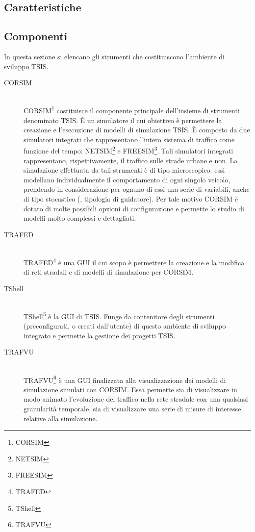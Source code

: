 \subsection{Caratteristiche}

\subsection{Componenti}

In questa sezione si elencano gli strumenti che costituiscono l'ambiente di sviluppo \acs{TSIS}.

\begin{description}
\item[CORSIM] \hfill \\
\acs{CORSIM}\footnote{\acf{CORSIM}} costituisce il componente principale dell'insieme di strumenti denominato \acs{TSIS}. È un simulatore il cui obiettivo è permettere la creazione e l'esecuzione di modelli di simulazione \acs{TSIS}. È composto da due simulatori integrati che rappresentano l'intero sistema di traffico come funzione del tempo: \acs{NETSIM}\footnote{\acf{NETSIM}} e \acs{FREESIM}\footnote{\acf{FREESIM}}. Tali simulatori integrati rappresentano, rispettivamente, il traffico sulle strade urbane e non. La simulazione effettuata da tali strumenti è di tipo microscopico: essi modellano individualmente il comportamento di ogni singolo veicolo, prendendo in considerazione per ognuno di essi una serie di variabili, anche di tipo stocastico (\eg{}, tipologia di guidatore). Per tale motivo \acs{CORSIM} è dotato di molte possibili opzioni di configurazione e permette lo studio di modelli molto complessi e dettagliati.
\item[TRAFED] \hfill \\
\acs{TRAFED}\footnote{\acf{TRAFED}} è una \acs{GUI} il cui scopo è permettere la creazione e la modifica di reti stradali e di modelli di simulazione per \acs{CORSIM}.
\item[TShell] \hfill \\
\acs{TShell}\footnote{\acf{TShell}} è la \acs{GUI} di \acs{TSIS}. Funge da contenitore degli strumenti (preconfigurati, o creati dall'utente) di questo ambiente di sviluppo integrato e permette la gestione dei progetti \acs{TSIS}.
\item[TRAFVU] \hfill \\
\acs{TRAFVU}\footnote{\acf{TRAFVU}} è una \acs{GUI} finalizzata alla visualizzazione dei modelli di simulazione simulati con \acs{CORSIM}. Essa permette sia di visualizzare in modo animato l'evoluzione del traffico nella rete stradale con una qualsiasi granularità temporale, sia di visualizzare una serie di misure di interesse relative alla simulazione.

\end{description}
